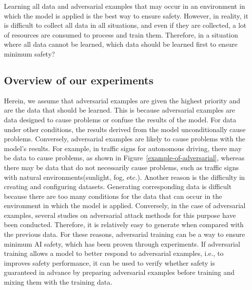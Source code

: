 \documentclass[journal,article,submit,moreauthors,pdftex]{Definitions/mdpi}
\begin{document}
Learning all data and adversarial examples that may occur in an environment in which the model is applied is the best way to ensure safety.
However, in reality, it is difficult to collect all data in all situations, and even if they are collected, a lot of resources are consumed to process and train them.
Therefore, in a situation where all data cannot be learned, which data should be learned first to ensure minimum safety?

\subsection{Overview of our experiments}

Herein, we assume that adversarial examples are given the highest priority and are the data that should be learned.
This is because adversarial examples are data designed to cause problems or confuse the results of the model.
For data under other conditions, the results derived from the model unconditionally cause problems.
Conversely, adversarial examples are likely to cause problems with the model's results.
For example, in traffic signs for autonomous driving, there may be data to cause problems, as shown in Figure~\ref{example-of-adversarial}, whereas there may be data that do not necessarily cause problems, such as traffic signs with natural environments(sunlight, fog, etc.).
Another reason is the difficulty in creating and configuring datasets. Generating corresponding data is difficult because there are too many conditions for the data that can occur in the environment in which the model is applied.
Conversely, in the case of adversarial examples, several studies on adversarial attack methods for this purpose have been conducted. Therefore, it is relatively easy to generate when compared with the previous data.
For these reasons, adversarial training can be a way to ensure minimum AI safety, which has been proven through experiments.
If adversarial training allows a model to better respond to adversarial examples, i.e., to improves safety performance, it can be used to verify whether safety is guaranteed in advance by preparing adversarial examples before training and mixing them with the training data.
\end{document}
